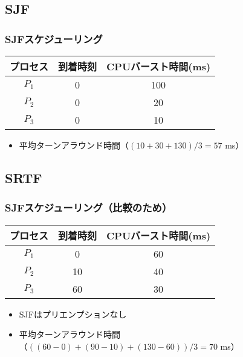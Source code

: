 \documentclass[unicode]{beamer}                   %
\begin{document}
\subsection{SJF}
\begin{frame}
  \frametitle{SJFスケジューリング}
  \small\begin{tabular}{c c c}
    プロセス & 到着時刻 & CPUバースト時間(ms) \\
    \hline
    $P_1$    & 0 & 100 \\
    $P_2$    & 0 & 20 \\
    $P_3$    & 0 & 10 \\
  \end{tabular}
  \begin{itemize}
    \item 平均ターンアラウンド時間（$(10+30+130) / 3 = 57$ ms）
  \end{itemize}
\end{frame}

\subsection{SRTF}
\begin{frame}
  \frametitle{SJFスケジューリング（比較のため）}
  \small\begin{tabular}{c c c}
    プロセス & 到着時刻 & CPUバースト時間(ms) \\
    \hline
    $P_1$    & 0  & 60 \\
    $P_2$    & 10 & 40 \\
    $P_3$    & 60 & 30 \\
  \end{tabular}
  \begin{itemize}
    \item SJFはプリエンプションなし
    \item 平均ターンアラウンド時間\\
      （$((60-0)+(90-10)+(130-60))/3=70$ ms）
  \end{itemize}
\end{frame}
\end{document}
